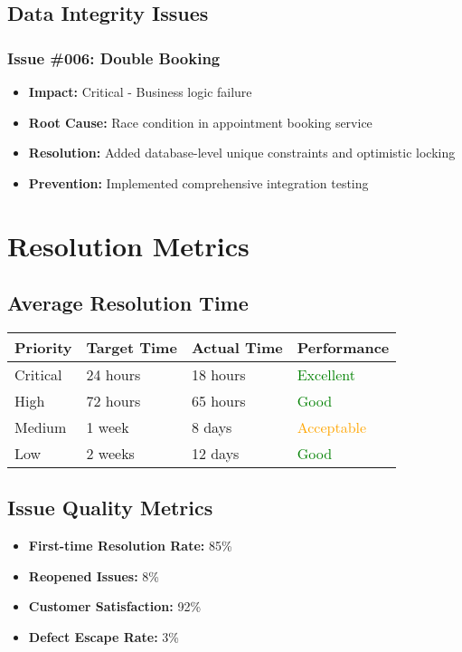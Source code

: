 \documentclass[12pt,a4paper]{article}
\begin{document}
\subsection{Data Integrity Issues}

\subsubsection{Issue \#006: Double Booking}
\begin{itemize}
    \item \textbf{Impact:} Critical - Business logic failure
    \item \textbf{Root Cause:} Race condition in appointment booking service
    \item \textbf{Resolution:} Added database-level unique constraints and optimistic locking
    \item \textbf{Prevention:} Implemented comprehensive integration testing
\end{itemize}

\section{Resolution Metrics}

\subsection{Average Resolution Time}

\begin{longtable}{|p{2.5cm}|p{2.5cm}|p{2.5cm}|p{4.5cm}|}
\hline
\textbf{Priority} & \textbf{Target Time} & \textbf{Actual Time} & \textbf{Performance} \\
\hline
Critical & 24 hours & 18 hours & \textcolor{green}{Excellent} \\
\hline
High & 72 hours & 65 hours & \textcolor{green}{Good} \\
\hline
Medium & 1 week & 8 days & \textcolor{orange}{Acceptable} \\
\hline
Low & 2 weeks & 12 days & \textcolor{green}{Good} \\
\hline
\end{longtable}

\subsection{Issue Quality Metrics}

\begin{itemize}
    \item \textbf{First-time Resolution Rate:} 85\%
    \item \textbf{Reopened Issues:} 8\%
    \item \textbf{Customer Satisfaction:} 92\%
    \item \textbf{Defect Escape Rate:} 3\%
\end{itemize}
\end{document}
